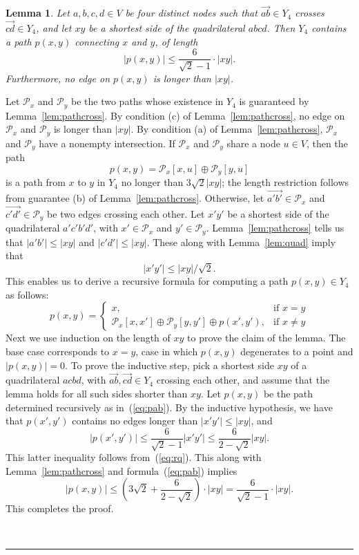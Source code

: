 \pdfoutput=1  \documentclass[11pt]{article}
\newtheorem{lemma}{Lemma}
\newcommand{\qed}{\rule{0.5em}{1.5ex}}
\newcommand{\fqed}{{\hfill~\qed}}
\newenvironment{proof}{{\noindent \bf Proof.}}
                      {{\hfill \fqed} \vspace{1em}}
\newcommand{\Pa}{{\mathcal P}}
\begin{document}
\begin{lemma}
Let $a, b, c, d \in V$ be four distinct nodes such that
$\overrightarrow{ab} \in Y_4$ crosses
$\overrightarrow{cd} \in Y_4$, and let
$xy$ be a shortest side of the quadrilateral $abcd$.
Then $Y_4$ contains a path $p(x,y)$ connecting $x$ and $y$, of length
\[
    |p(x,y)| \le \frac{6}{\sqrt{2}-1} \cdot |xy|.
\]
Furthermore, no edge on $p(x,y)$ is longer than $|xy|$.
\label{lem:recross}
\end{lemma}
\begin{proof}
Let $\Pa_x$ and $\Pa_y$ be the two paths whose existence in $Y_4$ is
guaranteed by Lemma~\ref{lem:pathcross}. By condition (c) of
Lemma~\ref{lem:pathcross}, no edge on $\Pa_x$ and $\Pa_y$ is longer
than $|xy|$. By condition (a) of Lemma~\ref{lem:pathcross}, $\Pa_x$ and
$\Pa_y$ have a nonempty intersection. If $\Pa_x$ and $\Pa_y$
share a node $u \in V$, then the path
\[
p(x, y) = \Pa_x[x, u] \oplus \Pa_y[y,u]
\]
is a path from $x$ to $y$ in $Y_4$ no longer than $3\sqrt{2}|xy|$;
the length restriction follows from guarantee (b) of Lemma~\ref{lem:pathcross}.
Otherwise, let $\overrightarrow{a'b'} \in \Pa_x$ and
$\overrightarrow{c'd'} \in \Pa_y$ be two edges crossing
each other. Let $x'y'$ be a shortest side of the quadrilateral
$a'c'b'd'$, with $x' \in \Pa_x$ and $y' \in \Pa_y$.
Lemma~\ref{lem:pathcross} tells us that $|a'b'| \le |xy|$ and $|c'd'| \le |xy|$.
These along with Lemma~\ref{lem:quad} imply that
\begin{equation}
|x'y'| \le |xy| / \sqrt{2}.
\label{eq:rq}
\end{equation}
This enables us to derive a recursive formula for computing a path
$p(x,y) \in Y_4$ as follows:
\begin{equation}
p(x, y) =
\begin{cases}
x, & \text{if $x = y$} \\
\Pa_x[x,x'] \oplus \Pa_y[y, y'] \oplus p(x', y'), & \text{if $x \neq y$}
\label{eq:pab}
\end{cases}
\end{equation}
Next we use induction on the length of $xy$ to prove the claim of the lemma.
The base case corresponds to $x=y$, case in which $p(x,y)$ degenerates to a point
and $|p(x,y)| = 0$.
To prove the inductive step, pick a shortest side $xy$ of a quadrilateral $acbd$, with
$\overrightarrow{ab}, \overrightarrow{cd} \in Y_4$ crossing each other, and assume that
the lemma holds for all such sides shorter than $xy$.
Let $p(x,y)$ be the path determined recursively as in~(\ref{eq:pab}).
By the inductive hypothesis, we have that $p(x',y')$ contains no edges longer
than $|x'y'| \le |xy|$, and
\[
    |p(x',y')| \le \frac{6}{\sqrt{2}-1} |x'y'| \le \frac{6}{2 - \sqrt{2}}|xy| .
\]
This latter inequality follows from~(\ref{eq:rq}). This along with Lemma~\ref{lem:pathcross}
and formula~(\ref{eq:pab}) implies
\[
    |p(x,y)| \le (3\sqrt{2} + \frac{6}{2-\sqrt{2}})\cdot|xy| = \frac{6}{\sqrt{2}-1}\cdot|xy|.
\]
This completes the proof.
\end{proof}
\end{document}
